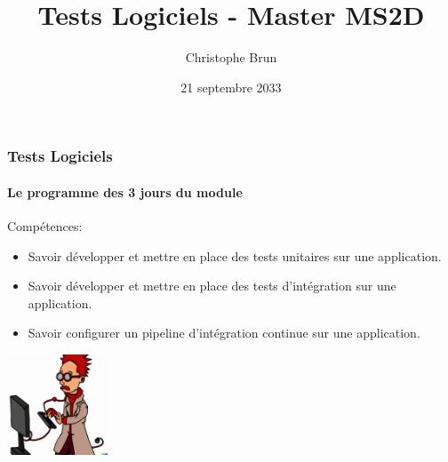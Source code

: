 \documentclass{beamer}
\title{Tests Logiciels - Master MS2D}
\author{Christophe Brun}
\institute{Campus Saint-Michel IT}
\date{21 septembre 2033}
\begin{document}
    \begin{frame}
        \transdissolve
        \titlepage
    \end{frame}

    \begin{frame}
        \frametitle{Tests Logiciels}
        \framesubtitle{Le programme des 3 jours du module}
        \transdissolve
        Compétences:
        \begin{itemize}
            \item Savoir développer et mettre en place des tests unitaires sur une application.

            \item Savoir développer et mettre en place des tests d’intégration sur une application.

            \item Savoir configurer un pipeline d’intégration continue sur une application.

        \end{itemize}
        \centering
        \includegraphics[width=3cm]{image/funny-cartoon-of-a-smart-young-computer-scientist.png}
    \end{frame}
\end{document}
